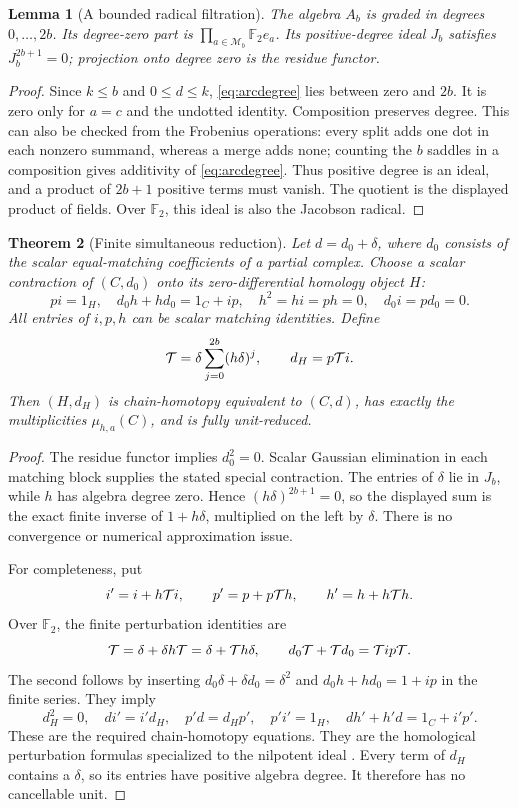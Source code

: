 \documentclass[11pt,letterpaper]{article}
\newtheorem{theorem}{Theorem}[section]
\newtheorem{lemma}[theorem]{Lemma}
\theoremstyle{definition}
\newcommand{\F}{\mathbb F_2}
\begin{document}
\begin{lemma}[A bounded radical filtration]
\label{lem:radical}
The algebra \(A_b\) is graded in degrees \(0,\ldots,2b\).
Its degree-zero part is \(\prod_{a\in\mathcal M_b}\F e_a\).
Its positive-degree ideal \(J_b\) satisfies \(J_b^{2b+1}=0\);
projection onto degree zero is the residue functor.
\end{lemma}
\begin{proof}
Since \(k\le b\) and \(0\le d\le k\), \eqref{eq:arcdegree} lies between
zero and \(2b\). It is zero only for \(a=c\) and the undotted identity.
Composition preserves degree. This can also be checked from the
Frobenius operations: every split adds one dot in each nonzero summand,
whereas a merge adds none; counting the \(b\) saddles in a composition
gives additivity of \eqref{eq:arcdegree}.
Thus positive degree is an ideal, and a product of \(2b+1\) positive
terms must vanish. The quotient is the displayed product of fields.
Over \(\F\), this ideal is also the Jacobson radical.
\end{proof}

\begin{theorem}[Finite simultaneous reduction]
\label{thm:hpl}
Let \(d=d_0+\delta\), where \(d_0\) consists of the scalar
equal-matching coefficients of a partial complex. Choose a scalar
contraction of \((C,d_0)\) onto its zero-differential homology object \(H\):
\[
 pi=1_H,\quad d_0h+hd_0=1_C+ip,\quad
 h^2=hi=ph=0,\quad d_0i=pd_0=0.
\]
All entries of \(i,p,h\) can be scalar matching identities.
Define
\[
 {\cal T}
   =\delta\sum_{j=0}^{2b}(h\delta)^j,\qquad
                    d_H=p{\cal T}i.
\]
Then \((H,d_H)\) is chain-homotopy equivalent to \((C,d)\),
has exactly the multiplicities \(\mu_{h,a}(C)\), and is fully
unit-reduced.
\end{theorem}
\begin{proof}
The residue functor implies \(d_0^2=0\).
Scalar Gaussian elimination in each matching block supplies the stated
special contraction. The entries of \(\delta\) lie in \(J_b\), while
\(h\) has algebra degree zero. Hence
\((h\delta)^{2b+1}=0\), so the displayed sum is the exact finite inverse
of \(1+h\delta\), multiplied on the left by \(\delta\).
There is no convergence or numerical approximation issue.

For completeness, put
\[
 i'=i+h{\cal T}i,\qquad p'=p+p{\cal T}h,\qquad
 h'=h+h{\cal T}h.
\]
Over \(\F\), the finite perturbation identities are
\[
 {\cal T}=\delta+\delta h{\cal T}
         =\delta+{\cal T}h\delta,\qquad
 d_0{\cal T}+{\cal T}d_0={\cal T}ip{\cal T}.
\]
The second follows by inserting \(d_0\delta+\delta d_0=\delta^2\)
and \(d_0h+hd_0=1+ip\) in the finite series.
They imply
\[
 d_H^2=0,\quad di'=i'd_H,\quad p'd=d_Hp',\quad
 p'i'=1_H,\quad dh'+h'd=1_C+i'p'.
\]
These are the required chain-homotopy equations.
They are the homological perturbation formulas specialized to the
nilpotent ideal \cite{crainic}.
Every term of \(d_H\) contains a \(\delta\), so its entries have positive
algebra degree. It therefore has no cancellable unit.
\end{proof}
\end{document}
